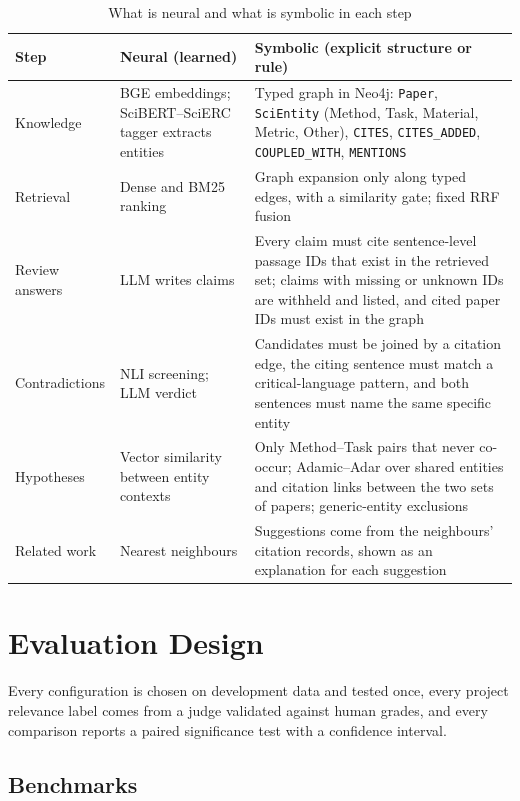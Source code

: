 \documentclass[conference]{IEEEtran}
\begin{document}
\begin{table}[t]
\centering
\caption{What is neural and what is symbolic in each step}
\label{tab:nesy}
\footnotesize
\begin{tabular}{@{}p{2.1cm}p{5.2cm}p{9.4cm}@{}}
\toprule
Step & Neural (learned) & Symbolic (explicit structure or rule) \\
\midrule
Knowledge & BGE embeddings; SciBERT--SciERC tagger extracts entities & Typed graph in Neo4j: \texttt{Paper}, \texttt{SciEntity} (Method, Task, Material, Metric, Other), \texttt{CITES}, \texttt{CITES\_ADDED}, \texttt{COUPLED\_WITH}, \texttt{MENTIONS} \\
Retrieval & Dense and BM25 ranking & Graph expansion only along typed edges, with a similarity gate; fixed RRF fusion \\
Review answers & LLM writes claims & Every claim must cite sentence-level passage IDs that exist in the retrieved set; claims with missing or unknown IDs are withheld and listed, and cited paper IDs must exist in the graph \\
Contradictions & NLI screening; LLM verdict & Candidates must be joined by a citation edge, the citing sentence must match a critical-language pattern, and both sentences must name the same specific entity \\
Hypotheses & Vector similarity between entity contexts & Only Method--Task pairs that never co-occur; Adamic--Adar over shared entities and citation links between the two sets of papers; generic-entity exclusions \\
Related work & Nearest neighbours & Suggestions come from the neighbours' citation records, shown as an explanation for each suggestion \\
\bottomrule
\end{tabular}
\end{table}

\section{Evaluation Design}
\label{sec:eval}

Every configuration is chosen on development data and tested once, every project relevance label comes from a judge validated against human grades, and every comparison reports a paired significance test with a confidence interval.

\subsection{Benchmarks}
\end{document}
